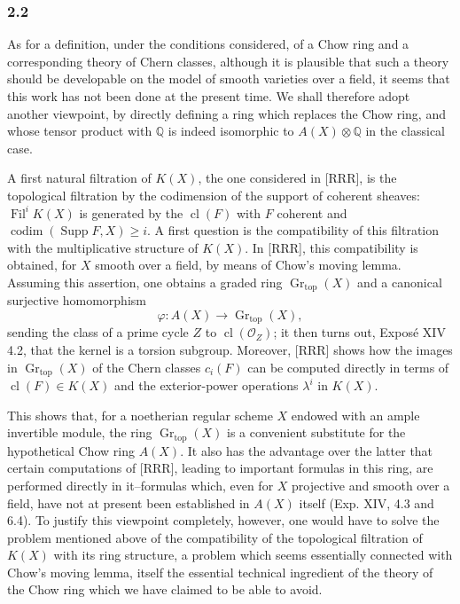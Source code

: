 \documentclass[11pt]{article}
\newcommand{\Gr}{\operatorname{Gr}}
\newcommand{\Fil}{\operatorname{Fil}}
\newcommand{\cl}{\operatorname{cl}}
\begin{document}
\subsubsection*{2.2}
As for a definition, under the conditions considered, of a Chow ring and a corresponding theory of Chern classes, although it is plausible that such a theory should be developable on the model of smooth varieties over a field, it seems that this work has not been done at the present time. We shall therefore adopt another viewpoint, by directly defining a ring which replaces the Chow ring, and whose tensor product with $\mathbb Q$ is indeed isomorphic to $A(X)\otimes\mathbb Q$ in the classical case.

A first natural filtration of $K(X)$, the one considered in [RRR], is the topological filtration by the codimension of the support of coherent sheaves: $\Fil^iK(X)$ is generated by the $\cl(F)$ with $F$ coherent and $\operatorname{codim}(\operatorname{Supp}F,X)\ge i$. A first question is the compatibility of this filtration with the multiplicative structure of $K(X)$. In [RRR], this compatibility is obtained, for $X$ smooth over a field, by means of Chow's moving lemma. Assuming this assertion, one obtains a graded ring $\Gr_{\mathrm{top}}(X)$ and a canonical surjective homomorphism
\[
\varphi:A(X)\longrightarrow \Gr_{\mathrm{top}}(X),
\]
sending the class of a prime cycle $Z$ to $\cl(\mathcal O_Z)$; it then turns out, Exposé XIV 4.2, that the kernel is a torsion subgroup. Moreover, [RRR] shows how the images in $\Gr_{\mathrm{top}}(X)$ of the Chern classes $c_i(F)$ can be computed directly in terms of $\cl(F)\in K(X)$ and the exterior-power operations $\lambda^i$ in $K(X)$.

This shows that, for a noetherian regular scheme $X$ endowed with an ample invertible module, the ring $\Gr_{\mathrm{top}}(X)$ is a convenient substitute for the hypothetical Chow ring $A(X)$. It also has the advantage over the latter that certain computations of [RRR], leading to important formulas in this ring, are performed directly in it--formulas which, even for $X$ projective and smooth over a field, have not at present been established in $A(X)$ itself (Exp. XIV, 4.3 and 6.4). To justify this viewpoint completely, however, one would have to solve the problem mentioned above of the compatibility of the topological filtration of $K(X)$ with its ring structure, a problem which seems essentially connected with Chow's moving lemma, itself the essential technical ingredient of the theory of the Chow ring which we have claimed to be able to avoid.
\end{document}
